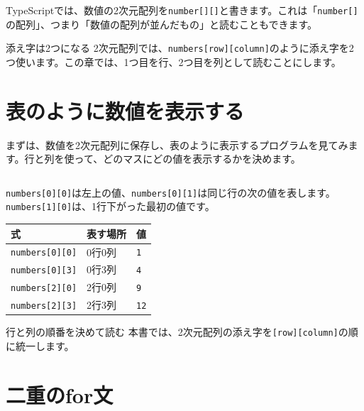 TypeScriptでは、数値の2次元配列を\texttt{number[][]}と書きます。これは「\texttt{number[]}の配列」、つまり「数値の配列が並んだもの」と読むこともできます。

\begin{pointbox}{添え字は2つになる}
2次元配列では、\texttt{numbers[row][column]}のように添え字を2つ使います。この章では、1つ目を行、2つ目を列として読むことにします。
\end{pointbox}

\section{表のように数値を表示する}

まずは、数値を2次元配列に保存し、表のように表示するプログラムを見てみます。行と列を使って、どのマスにどの値を表示するかを決めます。

\begin{listing}[htbp]
\inputminted{ts}{typescript-p5/listings/chapter13/grid-numbers.ts}
\caption{2次元配列の数値を表のように表示する（\texttt{chapter13/grid-numbers.ts}）}
\label{lst:chapter13-grid-numbers}
\end{listing}

\texttt{numbers[0][0]}は左上の値、\texttt{numbers[0][1]}は同じ行の次の値を表します。\texttt{numbers[1][0]}は、1行下がった最初の値です。

\begin{center}
\begin{tabular}{lll}
\toprule
式 & 表す場所 & 値 \\
\midrule
\texttt{numbers[0][0]} & 0行0列 & \texttt{1} \\
\texttt{numbers[0][3]} & 0行3列 & \texttt{4} \\
\texttt{numbers[2][0]} & 2行0列 & \texttt{9} \\
\texttt{numbers[2][3]} & 2行3列 & \texttt{12} \\
\bottomrule
\end{tabular}
\end{center}

\begin{notebox}{行と列の順番を決めて読む}
本書では、2次元配列の添え字を\texttt{[row][column]}の順に統一します。
\end{notebox}

\section{二重のfor文}

